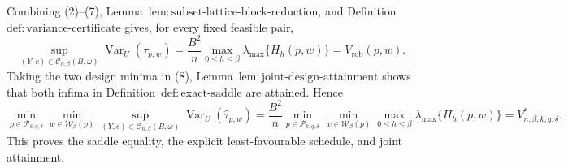 Combining (2)--(7), Lemma~\(\mathrm{lem{:}subset\text{-}lattice\text{-}block\text{-}reduction}\), and Definition~\(\mathrm{def{:}variance\text{-}certificate}\) gives, for every fixed feasible pair,
\[
\sup_{(Y,c)\in\mathcal C_{n,\beta}(B,\omega)}
\operatorname{Var}_U(\widehat\tau_{p,w})
=\frac{B^2}{n}\max_{0\le h\le\beta}
\lambda_{\max}\{H_h(p,w)\}
=V_{\mathrm{rob}}(p,w).
\tag{8}
\]
Taking the two design minima in (8), Lemma~\(\mathrm{lem{:}joint\text{-}design\text{-}attainment}\) shows that both infima in Definition~\(\mathrm{def{:}exact\text{-}saddle}\) are attained.  Hence
\[
\min_{p\in\mathcal P_{k,q,\delta}}
\min_{w\in\mathcal W_\beta(p)}
\sup_{(Y,c)\in\mathcal C_{n,\beta}(B,\omega)}
\operatorname{Var}_U(\widehat\tau_{p,w})
=\frac{B^2}{n}
\min_{p\in\mathcal P_{k,q,\delta}}
\min_{w\in\mathcal W_\beta(p)}
\max_{0\le h\le\beta}\lambda_{\max}\{H_h(p,w)\}
=V^*_{n,\beta,k,q,\delta}.
\tag{9}
\]
This proves the saddle equality, the explicit least-favourable schedule, and joint attainment.

